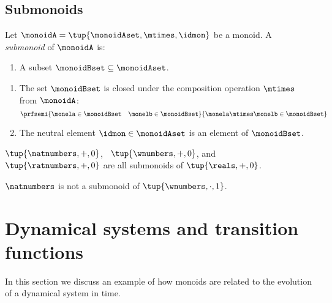 \subsection{Submonoids}


\begin{definition}
Let $\monoidA = \tup{\monoidAset, \mtimes, \idmon}$ be a monoid. A \emph{submonoid} of $\monoidA$ is:

\constit

\begin{enumerate}
\item A subset $\monoidBset \subseteq \monoidAset$.
\end{enumerate}

\condit

\begin{enumerate}
\item The set $\monoidBset$ is closed under the composition operation $\mtimes$ from $\monoidA$:
\begin{equation}
\prfsemi{\monela \in \monoidBset \quad \monelb \in \monoidBset}{\monela \mtimes \monelb \in \monoidBset}
\end{equation}

\item The neutral element $\idmon \in \monoidAset$ is an element of $\monoidBset$.
\end{enumerate}
\end{definition}

\begin{example}
$\tup{\natnumbers, +,0}$, ~$\tup{\wnumbers, +,0}$, and ~$\tup{\ratnumbers, +,0}$ are all submonoids of $\tup{\reals, +,0}$.
\end{example}

\begin{example}
$\natnumbers$ is not a submonoid of $\tup{\wnumbers, \cdot, 1}$.
\end{example}





\section{Dynamical systems and transition functions}

In this section we discuss an example of how monoids are related to the evolution of a dynamical system in time.

